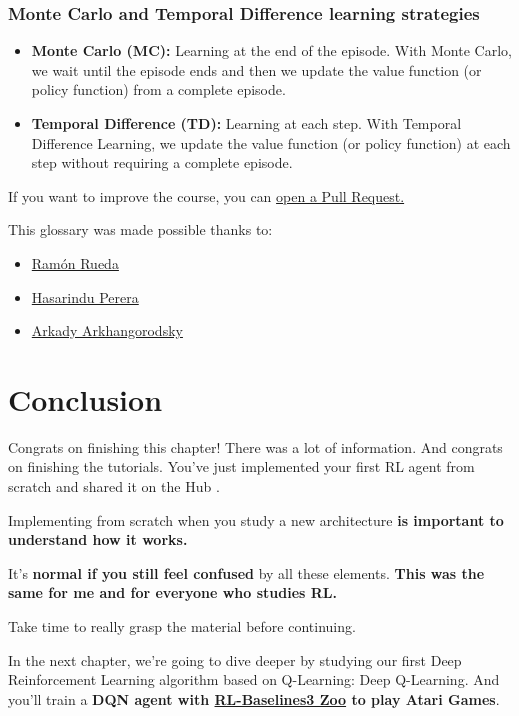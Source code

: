 \documentclass[11pt,a4paper]{article}
\begin{document}
\subsubsection{Monte Carlo and Temporal Difference learning strategies}\label{monte-carlo-and-temporal-difference-learning-strategies}

\begin{itemize}
\item
  \textbf{Monte Carlo (MC):} Learning at the end of the episode. With Monte Carlo, we wait until the episode ends and then we update the value function (or policy function) from a complete episode.
\item
  \textbf{Temporal Difference (TD):} Learning at each step. With Temporal Difference Learning, we update the value function (or policy function) at each step without requiring a complete episode.
\end{itemize}

If you want to improve the course, you can \href{https://github.com/huggingface/deep-rl-class/pulls}{open a Pull Request.}

This glossary was made possible thanks to:

\begin{itemize}
\tightlist
\item
  \href{https://github.com/ramon-rd}{Ramón Rueda}
\item
  \href{https://github.com/hasarinduperera/}{Hasarindu Perera}
\item
  \href{https://github.com/arkadyark/}{Arkady Arkhangorodsky}
\end{itemize}

\section{Conclusion}\label{conclusion}

Congrats on finishing this chapter! There was a lot of information. And congrats on finishing the tutorials. You've just implemented your first RL agent from scratch and shared it on the Hub .

Implementing from scratch when you study a new architecture \textbf{is important to understand how it works.}

It's \textbf{normal if you still feel confused} by all these elements. \textbf{This was the same for me and for everyone who studies RL.}

Take time to really grasp the material before continuing.

In the next chapter, we're going to dive deeper by studying our first Deep Reinforcement Learning algorithm based on Q-Learning: Deep Q-Learning. And you'll train a \textbf{DQN agent with \href{https://github.com/DLR-RM/rl-baselines3-zoo}{RL-Baselines3 Zoo} to play Atari Games}.
\end{document}
